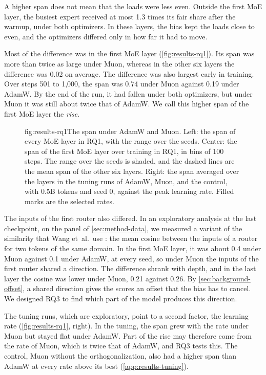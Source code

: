 A higher span does not mean that the loads were less even. Outside the first MoE layer, the busiest expert received at most 1.3 times its fair share after the warmup, under both optimizers. In these layers, the bias kept the loads close to even, and the optimizers differed only in how far it had to move.

Most of the difference was in the first MoE layer (\cref{fig:results-rq1}). Its span was more than twice as large under Muon, whereas in the other six layers the difference was 0.02 on average. The difference was also largest early in training. Over steps 501 to 1,000, the span was 0.74 under Muon against 0.19 under AdamW\@. By the end of the run, it had fallen under both optimizers, but under Muon it was still about twice that of AdamW\@. We call this higher span of the first MoE layer the \emph{rise}.

\begin{figure}[The span under AdamW and Muon in RQ1 and in the tuning]{fig:results-rq1}{The span under AdamW and Muon. Left: the span of every MoE layer in RQ1, with the range over the seeds. Center: the span of the first MoE layer over training in RQ1, in bins of 100 steps. The range over the seeds is shaded, and the dashed lines are the mean span of the other six layers. Right: the span averaged over the layers in the tuning runs of AdamW, Muon, and the control, with 0.5B tokens and seed 0, against the peak learning rate. Filled marks are the selected rates.}
  
\end{figure}

The inputs of the first router also differed. In an exploratory analysis at the last checkpoint, on the panel of \cref{sec:method-data}, we measured a variant of the similarity that Wang et~al.\ use \cite{wang2026myth}: the mean cosine between the inputs of a router for two tokens of the same domain. In the first MoE layer, it was about 0.4 under Muon against 0.1 under AdamW, at every seed, so under Muon the inputs of the first router shared a direction. The difference shrank with depth, and in the last layer the cosine was lower under Muon, 0.21 against 0.26. By \cref{sec:background-offset}, a shared direction gives the scores an offset that the bias has to cancel. We designed RQ3 to find which part of the model produces this direction.

The tuning runs, which are exploratory, point to a second factor, the learning rate (\cref{fig:results-rq1}, right). In the tuning, the span grew with the rate under Muon but stayed flat under AdamW\@. Part of the rise may therefore come from the rate of Muon, which is twice that of AdamW, and RQ3 tests this. The control, Muon without the orthogonalization, also had a higher span than AdamW at every rate above its best (\cref{app:results-tuning}).

